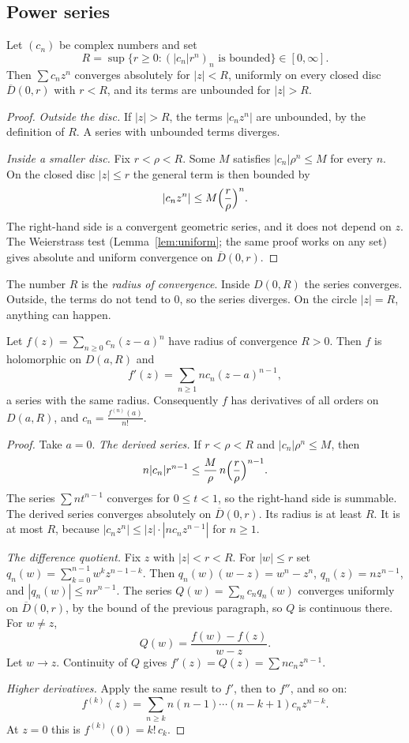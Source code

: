 \subsection*{Power series}

\begin{lemma}[Abel]\label{lem:abel}
Let $(c_n)$ be complex numbers and set
\[
R=\sup\{r\ge0:(|c_n|r^n)_n\text{ is bounded}\}\in[0,\infty].
\]
Then $\sum c_nz^n$ converges
absolutely for $|z|<R$, uniformly on every closed disc $\overline D(0,r)$ with $r<R$, and its terms are unbounded for $|z|>R$.
\end{lemma}
\begin{proof}
\textit{Outside the disc.} If $|z|>R$, the terms $|c_nz^n|$ are unbounded, by the definition of $R$. A series with unbounded terms diverges.

\textit{Inside a smaller disc.} Fix $r<\rho<R$. Some $M$ satisfies $|c_n|\rho^n\le M$ for every $n$. On the closed disc $|z|\le r$ the general term is then bounded by
\[
|c_nz^n|\le M\Bigl(\frac r\rho\Bigr)^n.
\]
The right-hand side is a convergent geometric series, and it does not depend on $z$. The Weierstrass test (Lemma~\ref{lem:uniform}; the same proof works on any set) gives absolute and uniform convergence on $\overline D(0,r)$.
\end{proof}

The number $R$ is the \emph{radius of convergence}. Inside $D(0,R)$ the series converges. Outside, the terms do not tend to $0$, so the series diverges. On the circle $|z|=R$, anything can happen.

\begin{theorem}\label{thm:powerseries}
Let $f(z)=\sum_{n\ge0}c_n(z-a)^n$ have radius of convergence $R>0$. Then $f$ is holomorphic on $D(a,R)$ and
\[
f'(z)=\sum_{n\ge1}nc_n(z-a)^{n-1},
\]
a series with the same radius. Consequently $f$ has derivatives of all orders on $D(a,R)$, and $c_n=\frac{f^{(n)}(a)}{n!}$.
\end{theorem}
\begin{proof}
Take $a=0$. \textit{The derived series.} If $r<\rho<R$ and $|c_n|\rho^n\le M$, then
\[
n|c_n|r^{n-1}\le\frac M\rho\,n\Bigl(\frac r\rho\Bigr)^{n-1}.
\]
The series $\sum n t^{n-1}$ converges for $0\le t<1$, so the right-hand side is summable. The derived series converges absolutely on $\overline D(0,r)$. Its radius is at least $R$. It is at most $R$, because $|c_nz^n|\le|z|\cdot|nc_nz^{n-1}|$ for $n\ge1$.

\textit{The difference quotient.} Fix $z$ with $|z|<r<R$. For $|w|\le r$ set $q_n(w)=\sum_{k=0}^{n-1}w^kz^{n-1-k}$. Then $q_n(w)(w-z)=w^n-z^n$, $q_n(z)=nz^{n-1}$, and $|q_n(w)|\le nr^{n-1}$. The series $Q(w)=\sum_nc_nq_n(w)$ converges uniformly on $\overline D(0,r)$, by the bound of the previous paragraph, so $Q$ is continuous there. For $w\ne z$,
\[
Q(w)=\frac{f(w)-f(z)}{w-z}.
\]
Let $w\to z$. Continuity of $Q$ gives $f'(z)=Q(z)=\sum nc_nz^{n-1}$.

\textit{Higher derivatives.} Apply the same result to $f'$, then to $f''$, and so on:
\[
f^{(k)}(z)=\sum_{n\ge k}n(n-1)\cdots(n-k+1)c_nz^{n-k}.
\]
At $z=0$ this is $f^{(k)}(0)=k!\,c_k$.
\end{proof}

